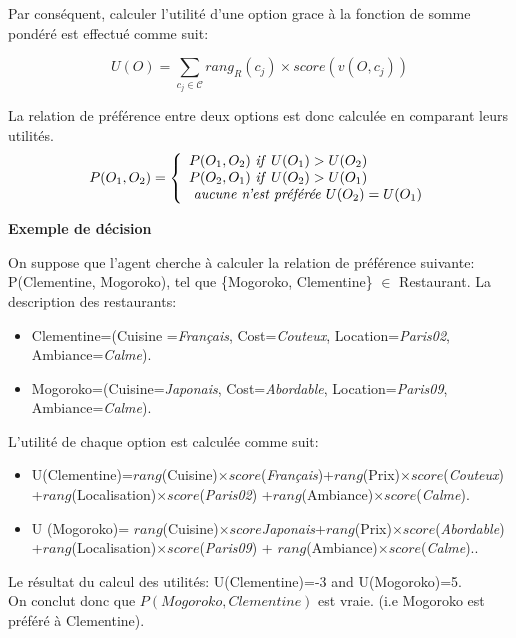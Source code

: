 \documentclass[a4paper,french]{article}
\begin{document}
Par conséquent, calculer l'utilité d'une option grace à la fonction de somme pondéré est effectué comme suit:

\[U(O) = \sum_{c_j \in \mathcal{C}}  rang_R(c_j) \times score\left( v(O, c_j) \right) \] 


\par La relation de préférence entre deux options est donc calculée en comparant leurs utilités. 
\[ P(O_1, O_2)  = \left \{
\begin{array}{l}
P(O_1, O_2)$ \textit{if}  $U(O_1) > U(O_2) \\
P(O_2, O_1)$  \textit{if}  $U(O_2) > U(O_1) \\
$  \textit{aucune n'est préférée}  $U(O_2) = U(O_1)\\
\end{array}
\right .\]

 \par \textbf{Exemple de décision}

On suppose que l'agent cherche à calculer la relation de préférence suivante:  P(Clementine, Mogoroko), tel que 
\{Mogoroko, Clementine\} $\in$ Restaurant. La description des restaurants: 
\begin{itemize}
	\item Clementine=(Cuisine =\textit{Français}, Cost=\textit{Couteux}, Location=\textit{Paris02},
	\\Ambiance=\textit{Calme}).
	\item Mogoroko=(Cuisine=\textit{Japonais}, Cost=\textit{Abordable}, Location=\textit{Paris09}, 
	\\Ambiance=\textit{Calme}).
\end{itemize}

L'utilité de chaque option est calculée comme suit:
\begin{itemize}
	\item U(Clementine)=$rang$(Cuisine)$\times score$(\textit{Français})+$rang$(Prix)$\times score$(\textit{Couteux})\\+$rang$(Localisation)$\times score$(\textit{Paris02})
	+$rang$(Ambiance)$\times score$(\textit{Calme}).
	\item U (Mogoroko)= $rang$(Cuisine)$\times score$\textit{Japonais}+$rang$(Prix)$\times score$(\textit{Abordable})\\+$rang$(Localisation)$\times score$(\textit{Paris09}) +  
	$rang$(Ambiance)$\times score$(\textit{Calme})..
\end{itemize}
Le résultat du calcul des utilités: U(Clementine)=-3 and U(Mogoroko)=5.
\\  On conclut donc que $P(Mogoroko, Clementine)$ est vraie.
(i.e Mogoroko est préféré à Clementine).
\end{document}
